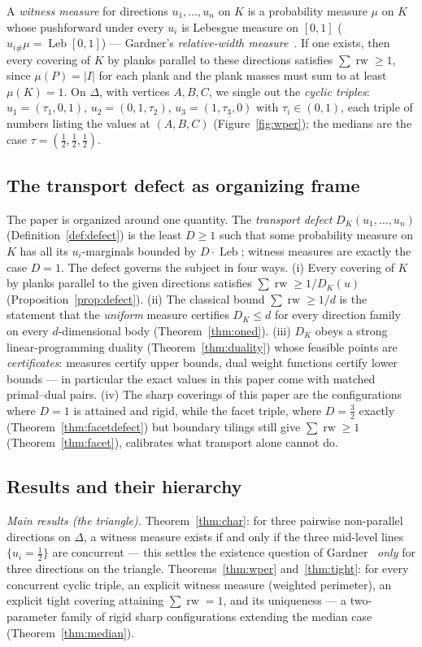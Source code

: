 \documentclass[11pt,reqno]{amsart}
\theoremstyle{plain}
\theoremstyle{definition}
\theoremstyle{remark}
\newcommand{\rw}{\operatorname{rw}}
\newcommand{\Leb}{\operatorname{Leb}}
\begin{document}
A \emph{witness measure} for directions $u_1,\dots,u_n$ on $K$ is a probability
measure $\mu$ on $K$ whose pushforward under every $u_i$ is Lebesgue measure on
$[0,1]$ ($u_{i\#}\mu=\Leb[0,1]$) --- Gardner's \emph{relative-width
measure}~\cite{Gardner88}. If one exists, then every covering of $K$ by planks
parallel to these directions satisfies $\sum\rw\ge1$, since $\mu(P)=|I|$ for
each plank and the plank masses must sum to at least $\mu(K)=1$.
On $\Delta$, with vertices $A,B,C$, we single out the \emph{cyclic triples}:
$u_1=(\tau_1,0,1)$, $u_2=(0,1,\tau_2)$, $u_3=(1,\tau_3,0)$ with
$\tau_i\in(0,1)$, each triple of numbers listing the values at $(A,B,C)$
(Figure~\ref{fig:wper}); the medians are the case
$\tau=(\tfrac12,\tfrac12,\tfrac12)$.

\subsection*{The transport defect as organizing frame}
The paper is organized around one quantity. The \emph{transport defect}
$D_K(u_1,\dots,u_n)$ (Definition~\ref{def:defect}) is the least $D\ge1$ such
that some probability measure on $K$ has all its $u_i$-marginals bounded by
$D\cdot\Leb$; witness measures are exactly the case $D=1$. The defect governs
the subject in four ways. (i) Every covering of $K$ by planks parallel to the
given directions satisfies $\sum\rw\ge1/D_K(u)$
(Proposition~\ref{prop:defect}). (ii) The classical bound $\sum\rw\ge1/d$ is
the statement that the \emph{uniform} measure certifies $D_K\le d$ for every
direction family on every $d$-dimensional body (Theorem~\ref{thm:oned}).
(iii) $D_K$ obeys a strong linear-programming duality
(Theorem~\ref{thm:duality}) whose feasible points are \emph{certificates}:
measures certify upper bounds, dual weight functions certify lower bounds ---
in particular the exact values in this paper come with matched primal--dual
pairs. (iv) The sharp coverings of this paper are the configurations where
$D=1$ is attained and rigid, while the facet triple, where
$D=\tfrac32$ exactly (Theorem~\ref{thm:facetdefect}) but boundary tilings
still give $\sum\rw\ge1$ (Theorem~\ref{thm:facet}), calibrates what transport
alone cannot do.

\subsection*{Results and their hierarchy}
\emph{Main results (the triangle).} Theorem~\ref{thm:char}: for three pairwise
non-parallel directions on $\Delta$, a witness measure exists if and only if
the three mid-level lines $\{u_i=\tfrac12\}$ are concurrent --- this settles
the existence question of Gardner~\cite{Gardner88} \emph{only} for three
directions on the triangle. Theorems~\ref{thm:wper} and~\ref{thm:tight}: for
every concurrent cyclic triple, an explicit witness measure (weighted
perimeter), an explicit tight covering attaining $\sum\rw=1$, and its
uniqueness --- a two-parameter family of rigid sharp configurations extending
the median case (Theorem~\ref{thm:median}).
\end{document}
